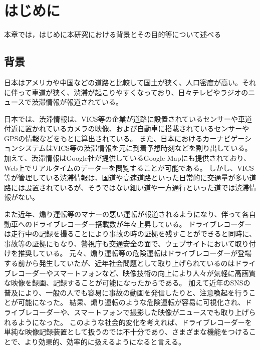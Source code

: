 \chapter{はじめに}
本章では，はじめに本研究における背景とその目的等について述べる
\section{背景}
日本はアメリカや中国などの道路と比較して国土が狭く、人口密度が高い。それに伴って車道が狭く、渋滞が起こりやすくなっており、日々テレビやラジオのニュースで渋滞情報が報道されている。


日本では、渋滞情報は、VICS等の企業が道路に設置されているセンサーや車道付近に置かれているカメラの映像、および自動車に搭載されているセンサーやGPSの情報などをもとに算出されている。
また、日本におけるカーナビゲーションシステムはVICS等の渋滞情報を元に到着予想時刻などを割り出している。
加えて、渋滞情報はGoogle社が提供しているGoogle Mapにも提供されており、Web上でリアルタイムのデーターを閲覧することが可能である。
しかし、VICS等が管理している渋滞情報は、国道や高速道路といった日常的に交通量が多い道路には設置されているが、そうではない細い道や一方通行といった道では渋滞情報がない。

また近年、煽り運転等のマナーの悪い運転が報道されるようになり、伴って各自動車へのドライブレコーダー搭載数が年々上昇している。
ドライブレコーダーは走行中の記録を撮ることにより事故の時の証拠を残すことができると同時に、事故等の証拠にもなり、警視庁も交通安全の面で、ウェブサイトにおいて取り付けを推奨している。
元々、煽り運転等の危険運転はドライブレコーダーが登場する前から発生していたが、近年社会問題として取り上げられているのはドライブレコーダーやスマートフォンなど、映像技術の向上により人々が気軽に高画質な映像を録画、記録することが可能になったからである。
加えて近年のSNSの普及により、一般の人でも容易に事故の動画を発信したりと、注意喚起を行うことが可能になった。
結果、煽り運転のような危険運転が容易に可視化され、ドライブレコーダーや、スマートフォンで撮影した映像がニュースでも取り上げられるようになった。
このような社会的変化を考えれば、ドライブレコーダーを単純な映像記録装置として扱うのでは不十分であり、さまざまな機能をつけることで、より効果的、効率的に扱えるようになると言える。

